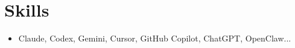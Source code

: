 \documentclass[letterpaper,10pt]{article}
\newcommand{\resumeSubHeadingListStart}{\begin{itemize}[leftmargin=0.15in, label={}]}
\newcommand{\resumeSubHeadingListEnd}{\end{itemize}\vspace{-5pt}}
\begin{document}

\section{Skills}
\resumeSubHeadingListStart
    \item Claude, Codex, Gemini, Cursor, GitHub Copilot, ChatGPT, OpenClaw...
\resumeSubHeadingListEnd



\end{document}
